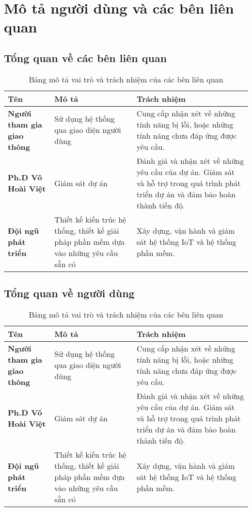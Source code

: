 \section{Mô tả người dùng và các bên liên quan}

\subsection{Tổng quan về các bên liên quan}

\begin{table}[h!]
    \centering
    \begin{tabular}{|p{4cm}|p{6cm}|p{6cm}|}
    \hline
    \textbf{Tên} & \textbf{Mô tả} & \textbf{Trách nhiệm} \\
    \hline
    \textbf{Người tham gia giao thông} & 
    Sử dụng hệ thống qua giao diện người dùng & 
    Cung cấp nhận xét về những tính năng bị lỗi, hoặc những tính năng chưa đáp ứng được yêu cầu. \\
    \hline
    \textbf{Ph.D Võ Hoài Việt} & 
    Giám sát dự án & 
    Đánh giá và nhận xét về những yêu cầu của dự án. Giám sát và hỗ trợ trong quá trình phát triển dự án và đảm bảo hoàn thành tiến độ. \\
    \hline
    \textbf{Đội ngũ phát triển} & 
    Thiết kế kiến trúc hệ thống, thiết kế giải pháp phần mềm dựa vào những yêu cầu sẵn có & 
    Xây dựng, vận hành và giám sát hệ thống IoT và hệ thống phần mềm. \\
    \hline
    \end{tabular}
    \caption{Bảng mô tả vai trò và trách nhiệm của các bên liên quan}
\end{table}

\subsection{Tổng quan về người dùng}

\begin{table}[h!]
    \centering
    \begin{tabular}{|p{4cm}|p{6cm}|p{6cm}|}
    \hline
    \textbf{Tên} & \textbf{Mô tả} & \textbf{Trách nhiệm} \\
    \hline
    \textbf{Người tham gia giao thông} & 
    Sử dụng hệ thống qua giao diện người dùng & 
    Cung cấp nhận xét về những tính năng bị lỗi, hoặc những tính năng chưa đáp ứng được yêu cầu. \\
    \hline
    \textbf{Ph.D Võ Hoài Việt} & 
    Giám sát dự án & 
    Đánh giá và nhận xét về những yêu cầu của dự án. Giám sát và hỗ trợ trong quá trình phát triển dự án và đảm bảo hoàn thành tiến độ. \\
    \hline
    \textbf{Đội ngũ phát triển} & 
    Thiết kế kiến trúc hệ thống, thiết kế giải pháp phần mềm dựa vào những yêu cầu sẵn có & 
    Xây dựng, vận hành và giám sát hệ thống IoT và hệ thống phần mềm. \\
    \hline
    \end{tabular}
    \caption{Bảng mô tả vai trò và trách nhiệm của các bên liên quan}
\end{table}

